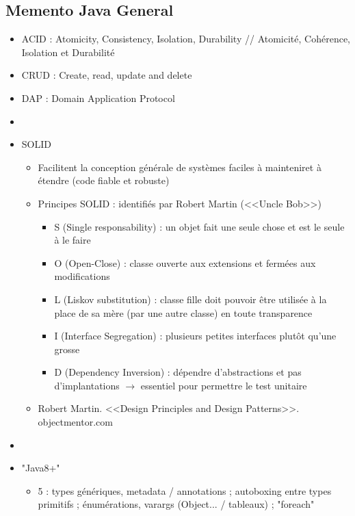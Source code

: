 \documentclass[11pt,twoside,a4paper]{article}
\begin{document}
\begin{landscape}


\begin{multicols}{2}
	\section*{Memento Java General}
	
	\begin{itemize}
		\item ACID : Atomicity, Consistency, Isolation, Durability // Atomicit{\'e}, Coh{\'e}rence, Isolation et Durabilit{\'e}
		\item CRUD : Create, read, update and delete
		\item DAP : Domain Application Protocol 
		\item[] 
		\item SOLID
		\begin{itemize}
			\item[] Facilitent la conception g{\'e}n{\'e}rale de syst{\`e}mes faciles {\`a} mainteniret {\`a} {\'e}tendre (code fiable et robuste)
			\item[] Principes SOLID : identifi{\'e}s par Robert Martin (<<Uncle Bob>>)
			\begin{itemize}
				\item S (Single responsability) : un objet fait une seule chose et est le seule {\`a} le faire
				\item O (Open-Close) : classe ouverte aux extensions et ferm{\'e}es aux modifications
				\item L (Liskov substitution) : classe fille doit pouvoir {\^e}tre utilis{\'e}e {\`a} la place de sa m{\`e}re (par une autre classe) en toute transparence
				\item I (Interface Segregation) : plusieurs petites interfaces plut{\^o}t qu'une grosse
				\item D (Dependency Inversion) : d{\'e}pendre d'abstractions et pas d'implantations $\rightarrow$ essentiel pour permettre le test unitaire
			\end{itemize}
			\item[] Robert Martin. <<Design Principles and Design Patterns>>. objectmentor.com
		\end{itemize}
		\item[] 
		\item "Java8+"
			\begin{itemize}
				\item 5 : types g{\'e}n{\'e}riques, metadata / annotations ; autoboxing entre types primitifs ; {\'e}num{\'e}rations, varargs (Object... / tableaux) ; "foreach"

\end{itemize}
\end{itemize}
\end{multicols}
\end{landscape}
\end{document}
